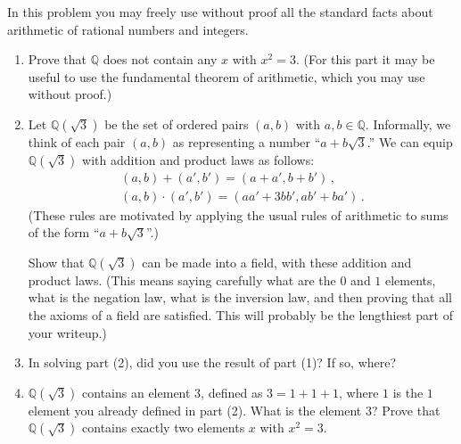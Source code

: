 \documentclass[12pt,letterpaper,reqno]{amsart}
\numberwithin{equation}{section}
\newcommand{\bbQ}{\ensuremath{\mathbb Q}}
\begin{document}
\begin{exercise}[10 points] In this problem you may freely use without proof all the standard facts about 
arithmetic of rational numbers and integers.

\begin{enumerate}

\item Prove that $\bbQ$ does not contain any $x$ with $x^2 = 3$. (For this part it may be useful to use the
fundamental theorem of arithmetic, which you may use without proof.)

\item Let $\bbQ(\sqrt{3})$ be the set of ordered pairs
$(a,b)$ with $a, b \in \bbQ$.
Informally, we think of each pair $(a,b)$
as representing a number ``$a + b \sqrt{3}$.''
We can equip $\bbQ(\sqrt{3})$ with addition and product laws as follows:
\begin{gather}
  (a,b)  +  (a',b') = (a+a', b+b') \, , \\
  (a,b) \cdot (a',b') = (aa' + 3bb', ab' + ba') \, .
\end{gather}
(These rules are motivated by applying the usual rules of arithmetic to sums of the form ``$a + b \sqrt3$''.)

Show that $\bbQ(\sqrt{3})$ can be made into a field, with these addition and product laws.
(This means saying carefully what are the $0$ and $1$ elements, what is the negation law, 
what is the inversion law, and 
then proving that all the axioms of a field are satisfied.
This will probably be the lengthiest part of your writeup.)

\item In solving part (2), did you use the result of part (1)? If so, where?

\item $\bbQ(\sqrt3)$ contains an element $3$, defined as $3 = 1 + 1 + 1$, where $1$ is the $1$ element
you already defined in part (2). What is the element $3$? Prove that $\bbQ(\sqrt3)$ contains exactly two elements $x$ with $x^2 = 3$.

\end{enumerate}

\end{exercise}
\end{document}
